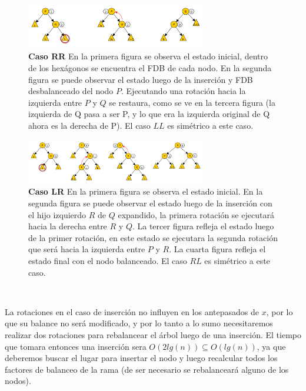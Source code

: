 ~

\begin{figure}
 \centering
 \includegraphics[width=0.70\textwidth]{graficos/RotacionSimpleAVL.pdf}
 \caption*{\newline \footnotesize \textbf{Caso RR} En la primera figura se observa el estado inicial, dentro de los hex\'agonos se encuentra el FDB de cada nodo. En la segunda figura se puede observar el estado luego de la inserci\'on y FDB desbalanceado del nodo $P$. Ejecutando una rotaci\'on hacia la izquierda entre $P$ y $Q$ se restaura, como se ve en la tercera figura (la izquierda de Q pasa a ser P, y lo que era la izquierda original de Q ahora es la derecha de P). El caso $LL$ es sim\'etrico a este caso.}
\end{figure}

\newpage
\begin{figure}
 \centering
 \includegraphics[width=0.70\textwidth]{graficos/RotacionDobleAVL.pdf}
 \caption*{\newline \footnotesize \textbf{Caso LR} En la primera figura se observa el estado inicial. En la segunda figura se puede observar el estado luego de la inserci\'on con el hijo izquierdo $R$ de $Q$ expandido, la primera rotaci\'on se ejecutar\'a hacia la derecha entre $R$ y $Q$. La tercer figura refleja el estado luego de la primer rotaci\'on, en este estado se ejecutara la segunda rotaci\'on que ser\'a hacia la izquierda entre $P$ y $R$. La cuarta figura refleja el estado final con el nodo balanceado. El caso $RL$ es sim\'etrico a este caso.}
\end{figure}

~

La rotaciones en el caso de inserci\'on no influyen en los antepasados de $x$, por lo que su balance no ser\'a modificado, y por lo tanto a lo sumo necesitaremos realizar dos rotaciones para rebalancear el \'arbol luego de una inserci\'on. El tiempo que tomara entonces una inserci\'on sera $O(2lg(n)) \subseteq O(lg(n))$, ya que deberemos buscar el lugar para insertar el nodo y luego recalcular todos los factores de balanceo de la rama (de ser necesario se rebalancear\'a alguno de los nodos).

